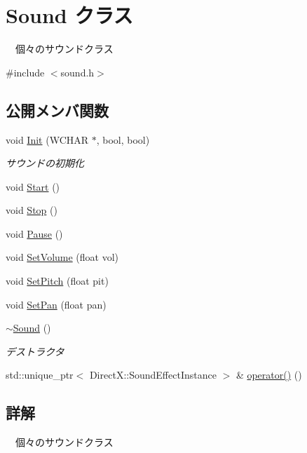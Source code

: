 \hypertarget{class_sound}{}\section{Sound クラス}
\label{class_sound}


　個々のサウンドクラス  




{\ttfamily \#include $<$sound.\+h$>$}

\subsection*{公開メンバ関数}
\begin{DoxyCompactItemize}
\item 
void \mbox{\hyperlink{class_sound_a3c8007c8e52bf541fc81adfa4b340b0f}{Init}} (W\+C\+H\+AR $\ast$, bool, bool)
\begin{DoxyCompactList}\small\item\em サウンドの初期化 \end{DoxyCompactList}\item 
void \mbox{\hyperlink{class_sound_ae021b518e93d7d8c6f3ea951cd4b98d8}{Start}} ()
\item 
void \mbox{\hyperlink{class_sound_a188de6836d531813da378464e392e813}{Stop}} ()
\item 
void \mbox{\hyperlink{class_sound_a4e199b4346519a4977fe94998c4a77e7}{Pause}} ()
\item 
void \mbox{\hyperlink{class_sound_a993eee69f61611ca1b4621ea0952e2c8}{Set\+Volume}} (float vol)
\item 
void \mbox{\hyperlink{class_sound_a06b9680efb2b6b41b52d9f25ac0264f1}{Set\+Pitch}} (float pit)
\item 
void \mbox{\hyperlink{class_sound_a1b066e78405656b1475849139ca24dce}{Set\+Pan}} (float pan)
\item 
\mbox{\hyperlink{class_sound_a0907389078bf740be2a5763366ad3376}{$\sim$\+Sound}} ()
\begin{DoxyCompactList}\small\item\em デストラクタ \end{DoxyCompactList}\item 
std\+::unique\+\_\+ptr$<$ Direct\+X\+::\+Sound\+Effect\+Instance $>$ \& \mbox{\hyperlink{class_sound_a0d79b20f421c0020c53b08c05b6df25b}{operator()}} ()
\end{DoxyCompactItemize}


\subsection{詳解}
　個々のサウンドクラス 

